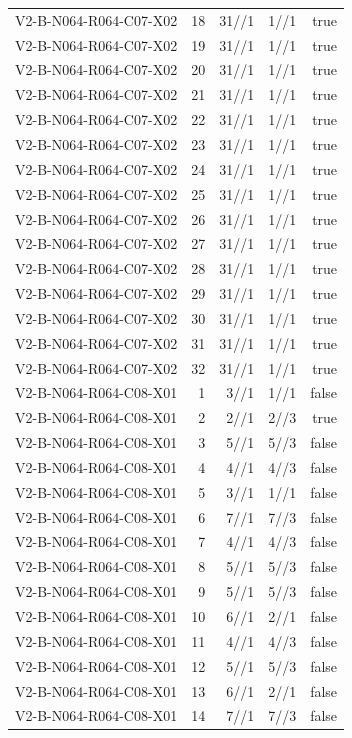 {\begin{longtable}{lrrrr}
V2-B-N064-R064-C07-X02 & 18 & 31//1 & 1//1 & true \\
V2-B-N064-R064-C07-X02 & 19 & 31//1 & 1//1 & true \\
V2-B-N064-R064-C07-X02 & 20 & 31//1 & 1//1 & true \\
V2-B-N064-R064-C07-X02 & 21 & 31//1 & 1//1 & true \\
V2-B-N064-R064-C07-X02 & 22 & 31//1 & 1//1 & true \\
V2-B-N064-R064-C07-X02 & 23 & 31//1 & 1//1 & true \\
V2-B-N064-R064-C07-X02 & 24 & 31//1 & 1//1 & true \\
V2-B-N064-R064-C07-X02 & 25 & 31//1 & 1//1 & true \\
V2-B-N064-R064-C07-X02 & 26 & 31//1 & 1//1 & true \\
V2-B-N064-R064-C07-X02 & 27 & 31//1 & 1//1 & true \\
V2-B-N064-R064-C07-X02 & 28 & 31//1 & 1//1 & true \\
V2-B-N064-R064-C07-X02 & 29 & 31//1 & 1//1 & true \\
V2-B-N064-R064-C07-X02 & 30 & 31//1 & 1//1 & true \\
V2-B-N064-R064-C07-X02 & 31 & 31//1 & 1//1 & true \\
V2-B-N064-R064-C07-X02 & 32 & 31//1 & 1//1 & true \\
V2-B-N064-R064-C08-X01 & 1 & 3//1 & 1//1 & false \\
V2-B-N064-R064-C08-X01 & 2 & 2//1 & 2//3 & true \\
V2-B-N064-R064-C08-X01 & 3 & 5//1 & 5//3 & false \\
V2-B-N064-R064-C08-X01 & 4 & 4//1 & 4//3 & false \\
V2-B-N064-R064-C08-X01 & 5 & 3//1 & 1//1 & false \\
V2-B-N064-R064-C08-X01 & 6 & 7//1 & 7//3 & false \\
V2-B-N064-R064-C08-X01 & 7 & 4//1 & 4//3 & false \\
V2-B-N064-R064-C08-X01 & 8 & 5//1 & 5//3 & false \\
V2-B-N064-R064-C08-X01 & 9 & 5//1 & 5//3 & false \\
V2-B-N064-R064-C08-X01 & 10 & 6//1 & 2//1 & false \\
V2-B-N064-R064-C08-X01 & 11 & 4//1 & 4//3 & false \\
V2-B-N064-R064-C08-X01 & 12 & 5//1 & 5//3 & false \\
V2-B-N064-R064-C08-X01 & 13 & 6//1 & 2//1 & false \\
V2-B-N064-R064-C08-X01 & 14 & 7//1 & 7//3 & false \\

\end{longtable}}
